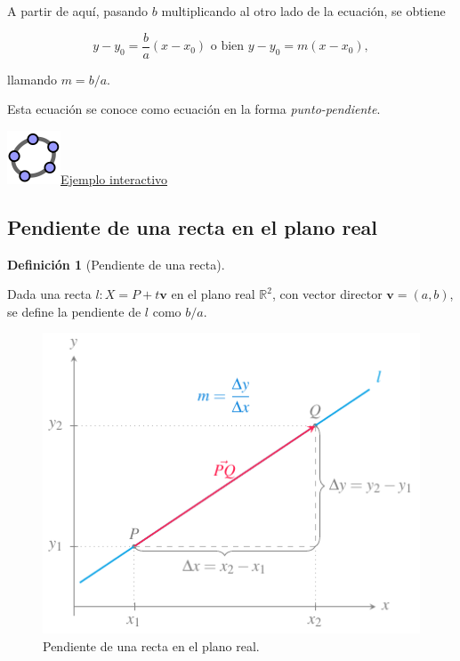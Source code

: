 \documentclass[
  a4paper,
]{scrreport}
\theoremstyle{definition}
\theoremstyle{plain}
\theoremstyle{definition}
\newtheorem{definition}{Definición}[chapter]
\theoremstyle{definition}
\theoremstyle{plain}
\theoremstyle{plain}
\theoremstyle{remark}
\begin{document}
A partir de aquí, pasando \(b\) multiplicando al otro lado de la
ecuación, se obtiene

\[
y-y_0 = \frac{b}{a}(x-x_0) \mbox{ o bien } y-y_0=m(x-x_0),
\]

llamando \(m=b/a\).

Esta ecuación se conoce como ecuación en la forma
\emph{punto-pendiente}.

\href{https://www.geogebra.org/m/JquQZ68R}{\includegraphics{img/logos/logo-geogebra.png}Ejemplo
interactivo}

\subsection{Pendiente de una recta en el plano
real}\label{pendiente-de-una-recta-en-el-plano-real}

\begin{definition}[Pendiente de una
recta]\protect\hypertarget{def-pendiente-recta}{}\label{def-pendiente-recta}

Dada una recta \(l: X=P+t\mathbf{v}\) en el plano real \(\mathbb{R}^2\),
con vector director \(\mathbf{v}=(a,b)\), se define la pendiente de
\(l\) como \(b/a\).

\end{definition}

\begin{figure}[H]

{\centering \includegraphics{img/geometria-plano-espacio/pendiente-recta.pdf}

}

\caption{Pendiente de una recta en el plano real.}

\end{figure}%
\end{document}
